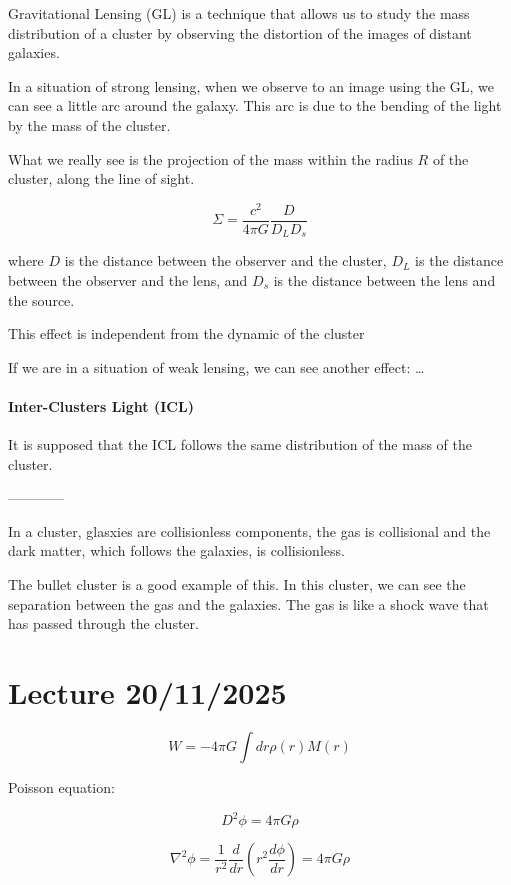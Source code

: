 Gravitational Lensing (GL) is a technique that allows us to study the mass distribution of a cluster by observing the distortion of the images of distant galaxies.

In a situation of strong lensing, when we observe to an image using the GL, we can see a little arc around the galaxy. This arc is due to the bending of the light by the mass of the cluster. 

What we really see is the projection of the mass within the radius $R$ of the cluster, along the line of sight. 

$$
\Sigma= \dfrac{c^2}{4 \pi G} \dfrac{D}{D_L D_s}
$$

where $D$ is the distance between the observer and the cluster, $D_L$ is the distance between the observer and the lens, and $D_s$ is the distance between the lens and the source.

This effect is independent from the dynamic of the cluster


If we are in a situation of weak lensing, we can see another effect: \dots

\subsubsection{Inter-Clusters Light (ICL)}

It is supposed that the ICL follows the same distribution of the mass of the cluster. 

------------

In a cluster, glasxies are collisionless components, the gas is collisional and the dark matter, which follows the galaxies, is collisionless.

The bullet cluster is a good example of this. In this cluster, we can see the separation between the gas and the galaxies. The gas is like a shock wave that has passed through the cluster.


\chapter{Lecture 20/11/2025}

$$
W = -4 \pi G \int dr \rho(r) M(r)
$$

Poisson equation:

$$
D^2 \phi = 4 \pi G \rho
$$

$$
\nabla^2 \phi = \dfrac 1{r^2} \dfrac{d}{dr} \left( r^2 \dfrac{d\phi}{dr} \right) = 4 \pi G \rho
$$

